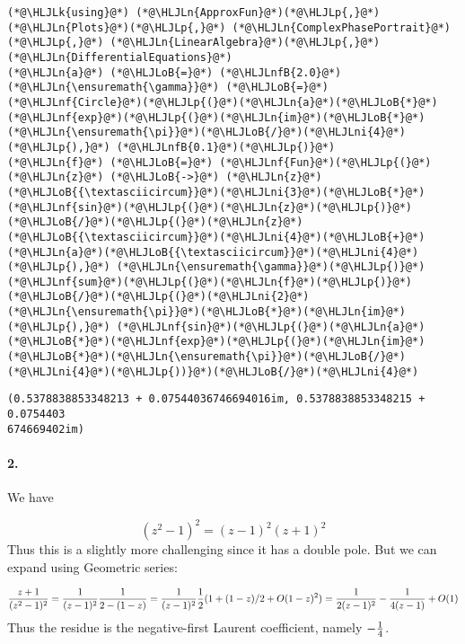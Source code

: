 \documentclass[12pt,a4paper]{article}
\newcommand{\HLJLk}[1]{\textcolor[RGB]{148,91,176}{\textbf{#1}}}
\newcommand{\HLJLn}[1]{#1}
\newcommand{\HLJLnf}[1]{\textcolor[RGB]{66,102,213}{#1}}
\newcommand{\HLJLnfB}[1]{\textcolor[RGB]{59,151,46}{#1}}
\newcommand{\HLJLni}[1]{\textcolor[RGB]{59,151,46}{#1}}
\newcommand{\HLJLoB}[1]{\textcolor[RGB]{102,102,102}{\textbf{#1}}}
\newcommand{\HLJLp}[1]{#1}
\begin{document}
\begin{lstlisting}
(*@\HLJLk{using}@*) (*@\HLJLn{ApproxFun}@*)(*@\HLJLp{,}@*) (*@\HLJLn{Plots}@*)(*@\HLJLp{,}@*) (*@\HLJLn{ComplexPhasePortrait}@*)(*@\HLJLp{,}@*) (*@\HLJLn{LinearAlgebra}@*)(*@\HLJLp{,}@*) (*@\HLJLn{DifferentialEquations}@*)
(*@\HLJLn{a}@*) (*@\HLJLoB{=}@*) (*@\HLJLnfB{2.0}@*)
(*@\HLJLn{\ensuremath{\gamma}}@*) (*@\HLJLoB{=}@*) (*@\HLJLnf{Circle}@*)(*@\HLJLp{(}@*)(*@\HLJLn{a}@*)(*@\HLJLoB{*}@*)(*@\HLJLnf{exp}@*)(*@\HLJLp{(}@*)(*@\HLJLn{im}@*)(*@\HLJLoB{*}@*)(*@\HLJLn{\ensuremath{\pi}}@*)(*@\HLJLoB{/}@*)(*@\HLJLni{4}@*)(*@\HLJLp{),}@*) (*@\HLJLnfB{0.1}@*)(*@\HLJLp{)}@*)
(*@\HLJLn{f}@*) (*@\HLJLoB{=}@*) (*@\HLJLnf{Fun}@*)(*@\HLJLp{(}@*)(*@\HLJLn{z}@*) (*@\HLJLoB{->}@*) (*@\HLJLn{z}@*)(*@\HLJLoB{{\textasciicircum}}@*)(*@\HLJLni{3}@*)(*@\HLJLoB{*}@*)(*@\HLJLnf{sin}@*)(*@\HLJLp{(}@*)(*@\HLJLn{z}@*)(*@\HLJLp{)}@*)(*@\HLJLoB{/}@*)(*@\HLJLp{(}@*)(*@\HLJLn{z}@*)(*@\HLJLoB{{\textasciicircum}}@*)(*@\HLJLni{4}@*)(*@\HLJLoB{+}@*)(*@\HLJLn{a}@*)(*@\HLJLoB{{\textasciicircum}}@*)(*@\HLJLni{4}@*)(*@\HLJLp{),}@*) (*@\HLJLn{\ensuremath{\gamma}}@*)(*@\HLJLp{)}@*)
(*@\HLJLnf{sum}@*)(*@\HLJLp{(}@*)(*@\HLJLn{f}@*)(*@\HLJLp{)}@*)(*@\HLJLoB{/}@*)(*@\HLJLp{(}@*)(*@\HLJLni{2}@*)(*@\HLJLn{\ensuremath{\pi}}@*)(*@\HLJLoB{*}@*)(*@\HLJLn{im}@*)(*@\HLJLp{),}@*) (*@\HLJLnf{sin}@*)(*@\HLJLp{(}@*)(*@\HLJLn{a}@*)(*@\HLJLoB{*}@*)(*@\HLJLnf{exp}@*)(*@\HLJLp{(}@*)(*@\HLJLn{im}@*)(*@\HLJLoB{*}@*)(*@\HLJLn{\ensuremath{\pi}}@*)(*@\HLJLoB{/}@*)(*@\HLJLni{4}@*)(*@\HLJLp{))}@*)(*@\HLJLoB{/}@*)(*@\HLJLni{4}@*)
\end{lstlisting}

\begin{lstlisting}
(0.5378838853348213 + 0.07544036746694016im, 0.5378838853348215 + 0.0754403
674669402im)
\end{lstlisting}


\paragraph{2.}
We have

\[
(z^2-1)^2 = (z-1)^2(z+1)^2
\]
Thus this is a slightly more challenging since it has a double pole. But we can expand using Geometric series:

\[
    {z+1 \over (z^2-1)^2} = {1 \over (z-1)^2} {1 \over 2 - (1-z)} = {1 \over (z-1)^2} {1 \over 2} (1 + (1-z)/2 +O(1-z)^2) = {1 \over 2(z-1)^2} - {1 \over 4 (z-1)}  + O(1)
\]
Thus the residue is the negative-first Laurent coefficient, namely $-{1 \over 4}$.
\end{document}

